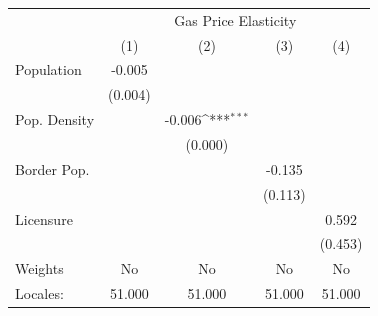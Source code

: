 {
\def\sym#1{\ifmmode^{#1}\else\(^{#1}\)\fi}
\begin{tabular}{l*{4}{c}}
\hline\hline
            &\multicolumn{4}{c}{Gas Price Elasticity}                                               \\
            &\multicolumn{1}{c}{(1)}         &\multicolumn{1}{c}{(2)}         &\multicolumn{1}{c}{(3)}         &\multicolumn{1}{c}{(4)}         \\
\hline
Population  &      -0.005         &                     &                     &                     \\
            &     (0.004)         &                     &                     &                     \\
[1em]
Pop. Density&                     &      -0.006\sym{***}&                     &                     \\
            &                     &     (0.000)         &                     &                     \\
[1em]
Border Pop. &                     &                     &      -0.135         &                     \\
            &                     &                     &     (0.113)         &                     \\
[1em]
Licensure   &                     &                     &                     &       0.592         \\
            &                     &                     &                     &     (0.453)         \\
\hline
Weights     &          No         &          No         &          No         &          No         \\
Locales:    &      51.000         &      51.000         &      51.000         &      51.000         \\
\hline\hline
\end{tabular}
}
